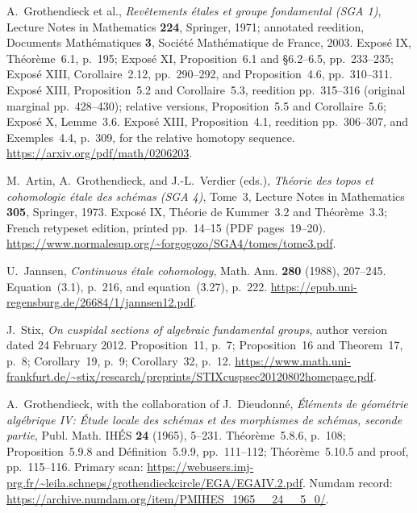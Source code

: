 
A.~Grothendieck et al., \emph{Rev\^etements \'etales et groupe fondamental
(SGA 1)}, Lecture Notes in Mathematics \textbf{224}, Springer, 1971;
annotated reedition, Documents Math\'ematiques \textbf{3},
Soci\'et\'e Math\'ematique de France, 2003.
Expos\'e IX, Th\'eor\`eme~6.1, p.~195;
Expos\'e XI, Proposition~6.1 and \S6.2--6.5, pp.~233--235;
Expos\'e XIII, Corollaire~2.12, pp.~290--292,
and Proposition~4.6, pp.~310--311.
Expos\'e XIII, Proposition~5.2 and Corollaire~5.3,
reedition pp.~315--316 (original marginal pp.~428--430);
relative versions, Proposition~5.5 and Corollaire~5.6;
Expos\'e X, Lemme~3.6.
Expos\'e XIII, Proposition~4.1, reedition pp.~306--307,
and Exemples~4.4, p.~309, for the relative homotopy sequence.
\url{https://arxiv.org/pdf/math/0206203}.

M.~Artin, A.~Grothendieck, and J.-L.~Verdier (eds.),
\emph{Th\'eorie des topos et cohomologie \'etale des sch\'emas
(SGA 4)}, Tome~3, Lecture Notes in Mathematics \textbf{305},
Springer, 1973. Expos\'e IX, Th\'eorie de Kummer~3.2 and
Th\'eor\`eme~3.3; French retypeset edition, printed pp.~14--15
(PDF pages~19--20).
\url{https://www.normalesup.org/~forgogozo/SGA4/tomes/tome3.pdf}.

U.~Jannsen, \emph{Continuous \'etale cohomology},
Math. Ann. \textbf{280} (1988), 207--245.
Equation~(3.1), p.~216, and equation~(3.27), p.~222.
\url{https://epub.uni-regensburg.de/26684/1/jannsen12.pdf}.

J.~Stix, \emph{On cuspidal sections of algebraic fundamental groups},
author version dated 24 February 2012.
Proposition~11, p.~7; Proposition~16 and Theorem~17, p.~8;
Corollary~19, p.~9; Corollary~32, p.~12.
\url{https://www.math.uni-frankfurt.de/~stix/research/preprints/STIXcuspsec20120802homepage.pdf}.

A.~Grothendieck, with the collaboration of J.~Dieudonn\'e,
\emph{\'El\'ements de g\'eom\'etrie alg\'ebrique IV:
\'Etude locale des sch\'emas et des morphismes de sch\'emas,
seconde partie}, Publ. Math. IH\'ES \textbf{24} (1965), 5--231.
Th\'eor\`eme~5.8.6, p.~108; Proposition~5.9.8 and
D\'efinition~5.9.9, pp.~111--112;
Th\'eor\`eme~5.10.5 and proof, pp.~115--116.
Primary scan:
\url{https://webusers.imj-prg.fr/~leila.schneps/grothendieckcircle/EGA/EGAIV.2.pdf}.
Numdam record: \url{https://archive.numdam.org/item/PMIHES_1965__24__5_0/}.
